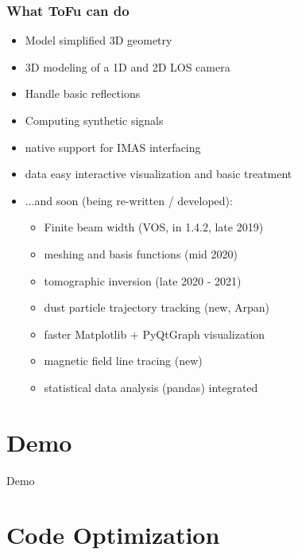 \documentclass[10pt]{beamer}
\begin{document}
\begin{frame}
\frametitle{What ToFu can do}
\begin{itemize}
	\item Model simplified 3D geometry
	\item 3D modeling of a 1D and 2D LOS camera
	\item Handle basic reflections
	\item Computing synthetic signals
	\item native support for IMAS interfacing
	\item data easy interactive visualization and basic treatment
	\pause
	\item ...and soon (being re-written / developed):
		\begin{itemize}
			\item Finite beam width (VOS, in 1.4.2, late 2019)
			\item meshing and basis functions (mid 2020)
			\item tomographic inversion (late 2020 - 2021)
			\item dust particle trajectory tracking (new, Arpan)
			\item faster Matplotlib + PyQtGraph visualization
			\item magnetic field line tracing (new)
			\item statistical data analysis (pandas) integrated
		\end{itemize}
\end{itemize}
\end{frame}
\section{Demo}

{
\begin{frame}[standout]
  Demo
\end{frame}
}

\section{Code Optimization}
\end{document}
